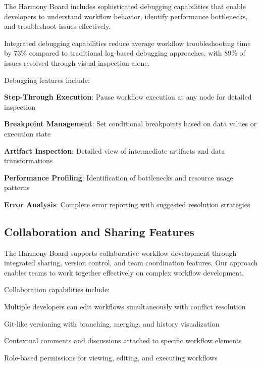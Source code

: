 The Harmony Board includes sophisticated debugging capabilities that enable developers to understand workflow behavior, identify performance bottlenecks, and troubleshoot issues effectively.

\begin{successbox}
Integrated debugging capabilities reduce average workflow troubleshooting time by 73\% compared to traditional log-based debugging approaches, with 89\% of issues resolved through visual inspection alone.
\end{successbox}

Debugging features include:

\begin{expandedlist}
    \item \textbf{Step-Through Execution}: Pause workflow execution at any node for detailed inspection
    \item \textbf{Breakpoint Management}: Set conditional breakpoints based on data values or execution state
    \item \textbf{Artifact Inspection}: Detailed view of intermediate artifacts and data transformations
    \item \textbf{Performance Profiling}: Identification of bottlenecks and resource usage patterns
    \item \textbf{Error Analysis}: Complete error reporting with suggested resolution strategies
\end{expandedlist}

\subsection*{Collaboration and Sharing Features}

The Harmony Board supports collaborative workflow development through integrated sharing, version control, and team coordination features. Our approach enables teams to work together effectively on complex workflow development.

Collaboration capabilities include:

\begin{description}[leftmargin=4cm,labelwidth=3.5cm]
    \item[\textbf{Real-Time Collaboration}] Multiple developers can edit workflows simultaneously with conflict resolution
    \item[\textbf{Version Control}] Git-like versioning with branching, merging, and history visualization
    \item[\textbf{Comment System}] Contextual comments and discussions attached to specific workflow elements
    \item[\textbf{Access Control}] Role-based permissions for viewing, editing, and executing workflows
\end{description}

